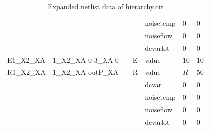 \begin{table}[h]
\begin{tabular}[c]{lllllll}
 & & & &\small{noisetemp} &$0$ &$0$ \\ 
 & & & &\small{noiseflow} &$0$ &$0$ \\ 
\rowcolor{myyellow}
 & & & &\small{dcvarlot} &$0$ &$0$ \\ 
\small{E1\_X2\_XA} &\small{1\_X2\_XA 0 3\_XA 0 } & &\small{E} &\small{value} &$10$ &$10$ \\ 
\rowcolor{myyellow}
\small{R1\_X2\_XA} &\small{1\_X2\_XA outP\_XA } & &\small{R} &\small{value} &$R$ &$50$ \\ 
 & & & &\small{dcvar} &$0$ &$0$ \\ 
\rowcolor{myyellow}
 & & & &\small{noisetemp} &$0$ &$0$ \\ 
 & & & &\small{noiseflow} &$0$ &$0$ \\ 
\rowcolor{myyellow}
 & & & &\small{dcvarlot} &$0$ &$0$ \\ 
\end{tabular}
\caption{Expanded netlist data of hierarchy.cir}
\end{table}

